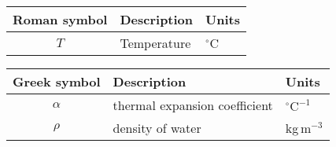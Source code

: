 

	\setlongtables
	\begin{longtable}{cll}
	\hline
	Roman symbol & Description & Units\\
	\hline
	\endhead
	\hline
	\endfoot
	$T$ & Temperature & $^\circ$C\\
\hline
\end{longtable}

	\setlongtables
\begin{longtable}{cll}
\hline
Greek symbol & Description & Units\\
\hline
\endhead
\hline
\endfoot
$\alpha$ & thermal expansion coefficient & $^\circ\textrm{C}^{-1}$\\
$\rho$ & density of water & kg\,m$^{-3}$\\
\hline
\end{longtable}


